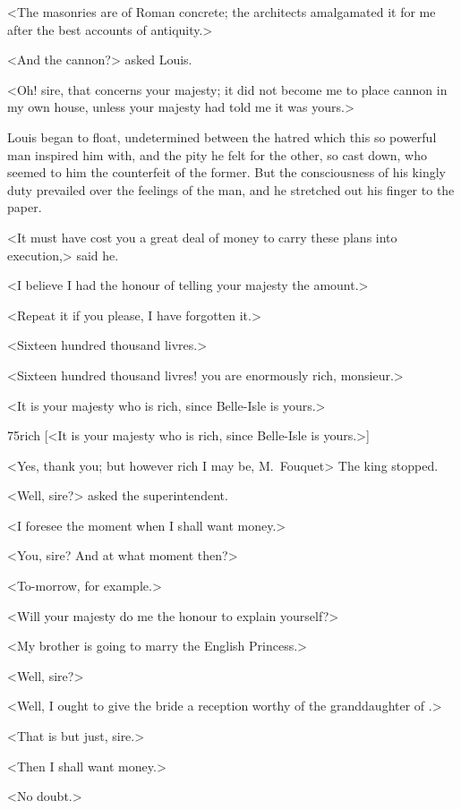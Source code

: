 <The masonries are of Roman concrete; the architects amalgamated it for me after the best accounts of antiquity.>

<And the cannon?> asked Louis.

<Oh! sire, that concerns your majesty; it did not become me to place cannon in my own house, unless your majesty had told me it was yours.>

Louis began to float, undetermined between the hatred which this so powerful man inspired him with, and the pity he felt for the other, so cast down, who seemed to him the counterfeit of the former. But the consciousness of his kingly duty prevailed over the feelings of the man, and he stretched out his finger to the paper.

<It must have cost you a great deal of money to carry these plans into execution,> said he.

<I believe I had the honour of telling your majesty the amount.>

<Repeat it if you please, I have forgotten it.>

<Sixteen hundred thousand livres.>

<Sixteen hundred thousand livres! you are enormously rich, monsieur.>

<It is your majesty who is rich, since Belle-Isle is yours.>

\begin{bwbigpic}
	[\basicscale] 
	{75rich}
	[<It is your majesty who is rich, since Belle-Isle is yours.>]
\end{bwbigpic}

<Yes, thank you; but however rich I may be, M.~Fouquet\longdash> The king stopped.

<Well, sire?> asked the superintendent.

<I foresee the moment when I shall want money.>

<You, sire? And at what moment then?>

<To-morrow, for example.>

<Will your majesty do me the honour to explain yourself?>

<My brother is going to marry the English Princess.>

<Well, sire?>

<Well, I ought to give the bride a reception worthy of the granddaughter of .>

<That is but just, sire.>

<Then I shall want money.>

<No doubt.>

